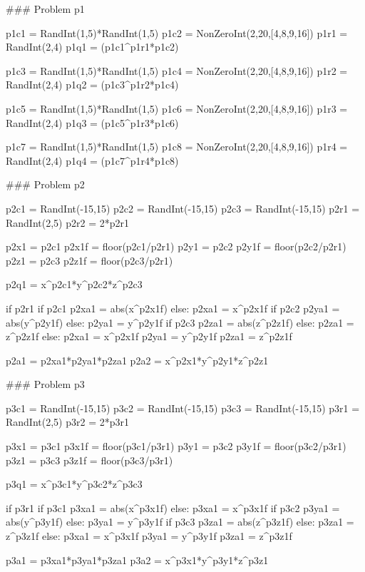 \documentclass{ximeraXloud}
\begin{document}
\begin{sagesilent}
### Problem p1

p1c1 = RandInt(1,5)*RandInt(1,5)
p1c2 = NonZeroInt(2,20,[4,8,9,16])
p1r1 = RandInt(2,4)
p1q1 = (p1c1^p1r1*p1c2)

p1c3 = RandInt(1,5)*RandInt(1,5)
p1c4 = NonZeroInt(2,20,[4,8,9,16])
p1r2 = RandInt(2,4)
p1q2 = (p1c3^p1r2*p1c4)

p1c5 = RandInt(1,5)*RandInt(1,5)
p1c6 = NonZeroInt(2,20,[4,8,9,16])
p1r3 = RandInt(2,4)
p1q3 = (p1c5^p1r3*p1c6)

p1c7 = RandInt(1,5)*RandInt(1,5)
p1c8 = NonZeroInt(2,20,[4,8,9,16])
p1r4 = RandInt(2,4)
p1q4 = (p1c7^p1r4*p1c8)


### Problem p2

p2c1 = RandInt(-15,15)
p2c2 = RandInt(-15,15)
p2c3 = RandInt(-15,15)
p2r1 = RandInt(2,5)
p2r2 = 2*p2r1

p2x1 = p2c1%
p2x1f = floor(p2c1/p2r1)
p2y1 = p2c2%
p2y1f = floor(p2c2/p2r1)
p2z1 = p2c3%
p2z1f = floor(p2c3/p2r1)

p2q1 = x^p2c1*y^p2c2*z^p2c3

if p2r1%
    if p2c1%
        p2xa1 = abs(x^p2x1f)
    else:
        p2xa1 = x^p2x1f
    if p2c2%
        p2ya1 = abs(y^p2y1f)
    else:
        p2ya1 = y^p2y1f
    if p2c3%
        p2za1 = abs(z^p2z1f)
    else:
        p2za1 = z^p2z1f
else:
    p2xa1 = x^p2x1f
    p2ya1 = y^p2y1f
    p2za1 = z^p2z1f

p2a1 = p2xa1*p2ya1*p2za1
p2a2 = x^p2x1*y^p2y1*z^p2z1


### Problem p3

p3c1 = RandInt(-15,15)
p3c2 = RandInt(-15,15)
p3c3 = RandInt(-15,15)
p3r1 = RandInt(2,5)
p3r2 = 2*p3r1

p3x1 = p3c1%
p3x1f = floor(p3c1/p3r1)
p3y1 = p3c2%
p3y1f = floor(p3c2/p3r1)
p3z1 = p3c3%
p3z1f = floor(p3c3/p3r1)

p3q1 = x^p3c1*y^p3c2*z^p3c3

if p3r1%
    if p3c1%
        p3xa1 = abs(x^p3x1f)
    else:
        p3xa1 = x^p3x1f
    if p3c2%
        p3ya1 = abs(y^p3y1f)
    else:
        p3ya1 = y^p3y1f
    if p3c3%
        p3za1 = abs(z^p3z1f)
    else:
        p3za1 = z^p3z1f
else:
    p3xa1 = x^p3x1f
    p3ya1 = y^p3y1f
    p3za1 = z^p3z1f

p3a1 = p3xa1*p3ya1*p3za1
p3a2 = x^p3x1*y^p3y1*z^p3z1



\end{sagesilent}
\end{document}
